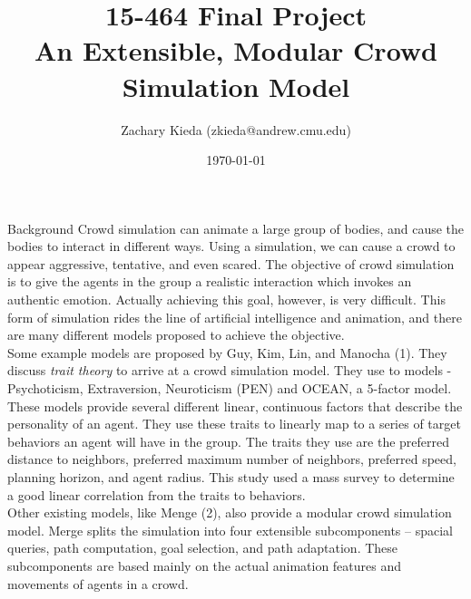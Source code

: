 \documentclass[11pt]{article}
\begin{document}
\title{15-464 Final Project\\
{An Extensible, Modular Crowd Simulation Model}}
\author{Zachary Kieda (zkieda@andrew.cmu.edu)}
\date{\today}
\maketitle
\begin{section}{Background}
Crowd simulation can animate a large group of bodies, and cause the bodies to interact in different ways. Using a simulation, we can cause a crowd to appear aggressive, tentative, and even scared. The objective of crowd simulation is to give the agents in the group a realistic interaction which invokes an authentic emotion. Actually achieving this goal, however, is very difficult. This form of simulation rides the line of artificial intelligence and animation, and there are many different models proposed to achieve the objective.\\

Some example models are proposed by Guy, Kim, Lin, and Manocha (1). They discuss \emph{trait theory} to arrive at a crowd simulation model. They use to models - Psychoticism, Extraversion, Neuroticism (PEN) and OCEAN, a 5-factor model. These models provide several different linear, continuous factors that describe the personality of an agent. They use these traits to linearly map to a series of target behaviors an agent will have in the group. The traits they use are the preferred distance to neighbors, preferred maximum number of neighbors, preferred speed, planning horizon, and agent radius. This study used a mass survey to determine a good linear correlation from the traits to behaviors.\\

Other existing models, like Menge (2), also provide a modular crowd simulation model. Merge splits the simulation into four extensible subcomponents -- spacial queries, path computation, goal selection, and path adaptation. These subcomponents are based mainly on the actual animation features and movements of agents in a crowd. \\


\end{section}
\end{document}
